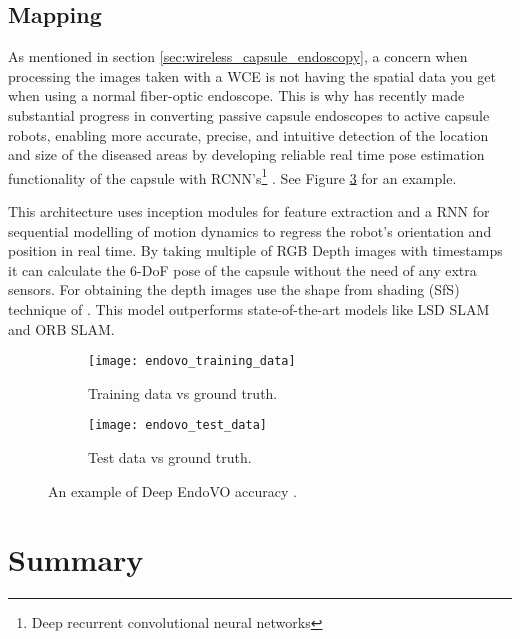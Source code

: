 \documentclass[thesis.tex]{subfiles}
\begin{document}
\subsection{Mapping} \label{sec:mapping}
As mentioned in section \ref{sec:wireless_capsule_endoscopy}, a concern when processing the images taken with a WCE is not having the spatial data you get when using a normal fiber-optic endoscope. This is why \citeauthor*{DeepEndoVO18} has recently made substantial progress in converting passive capsule endoscopes to active capsule robots, enabling more accurate, precise, and intuitive detection of the location and size of the diseased areas by developing reliable real time pose estimation functionality of the capsule with RCNN's\footnote{Deep recurrent convolutional neural networks} \cite{DeepEndoVO18}. See Figure \ref{fig:deep_endovo_example} for an example.

This architecture uses inception modules for feature extraction and a RNN for sequential modelling of motion dynamics to regress the robot's orientation and position in real time. By taking multiple of RGB Depth images with timestamps it can calculate the 6-DoF pose of the capsule without the need of any extra sensors. For obtaining the depth images \citeauthor*{DeepEndoVO18} use the shape from shading (SfS) technique of \citeauthor{ShapeShading94} \cite{ShapeShading94}. This model outperforms state-of-the-art models like LSD SLAM and ORB SLAM.

\begin{figure}[h] %
  \centering
  \begin{subfigure}[b]{0.4\linewidth}
    \centering
    \texttt{[image: endovo\_training\_data]}
    \caption{Training data vs ground truth.}
    \label{fig:endovo_training_data}
  \end{subfigure}
  \quad
  \begin{subfigure}[b]{0.4\linewidth}
    \centering
    \texttt{[image: endovo\_test\_data]}
    \caption{Test data vs ground truth.}
    \label{fig:endovo_test_data}
  \end{subfigure}
  \caption[An example of Deep EndoVO accuracy]{An example of Deep EndoVO accuracy \cite{DeepEndoVO18}.}
  \label{fig:deep_endovo_example}
\end{figure}



\section{Summary} \label{sec:C2-summary}
\end{document}
